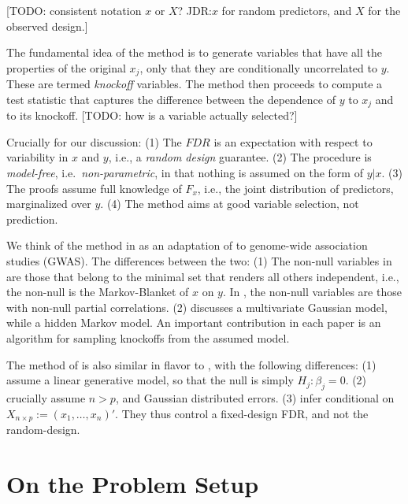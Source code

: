 \documentclass[article,lineno]{biometrika}
\begin{document}
[TODO: consistent notation $x$ or $X$? JDR:$x$ for random predictors, and $X$ for the observed design.]

The fundamental idea of the method is to generate variables that have all the properties of the original $x_j$, only that they are conditionally uncorrelated to $y$.
These are termed \emph{knockoff} variables.
The method then proceeds to compute a test statistic that captures the difference between the dependence of $y$ to $x_j$ and to its knockoff.
[TODO: how is a variable actually selected?]

Crucially for our discussion:
(1) The $FDR$ is an expectation with respect to variability in $x$ and $y$, i.e., a \emph{random design} guarantee.
(2) The procedure is \emph{model-free}, i.e.\ \emph{non-parametric}, in that nothing is assumed on the form of $y|x$.
(3) The proofs assume full knowledge of $F_x$, i.e., the joint distribution of predictors, marginalized over $y$.
(4) The method aims at good variable selection, not prediction.

We think of the method in \cite{SesiaGenehuntinghidden} as an adaptation of \cite{CandesPanninggoldmodelX2018} to genome-wide association studies (GWAS).
The differences between the two:
(1) The non-null variables in \cite{CandesPanninggoldmodelX2018} are those that belong to the minimal set that renders all others independent, i.e., the non-null is the Markov-Blanket of $x$ on $y$.
In \cite{SesiaGenehuntinghidden}, the non-null variables are those with non-null partial correlations.
(2) \cite{CandesPanninggoldmodelX2018} discusses a multivariate Gaussian model, while \cite{SesiaGenehuntinghidden} a hidden Markov model.
An important contribution in each paper is an algorithm for sampling knockoffs from the assumed model.

The method of \cite{SesiaGenehuntinghidden} is also similar in flavor to \cite{BarberControllingfalsediscovery2015}, with the following differences:
(1) \cite{BarberControllingfalsediscovery2015} assume a linear generative model, so that the null is simply $H_j:\beta_j=0$.
(2) \cite{BarberControllingfalsediscovery2015} crucially assume $n>p$, and Gaussian distributed errors.
(3) \cite{BarberControllingfalsediscovery2015} infer conditional on $X_{n \times p}:=(x_1,\dots,x_n)'$. They thus control a fixed-design FDR, and not the random-design.



\section{On the Problem Setup}
\end{document}
